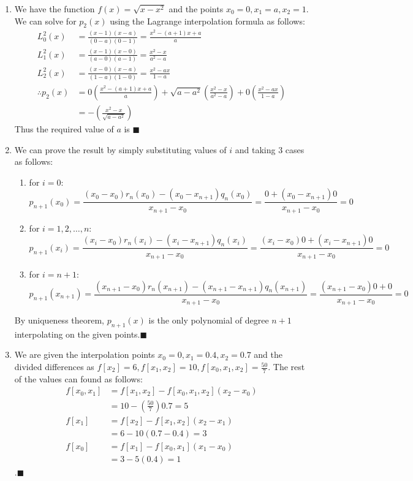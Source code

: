 \documentclass[a4paper, 11pt]{article}
\begin{document}
\begin{enumerate}[label=(\arabic*), leftmargin=*]
	\item We have the function $f(x)=\sqrt{x-x^2}$ and the points $x_0=0,x_1=a,x_2=1$. We can solve for $p_2(x)$ using the Lagrange interpolation formula as follows:
\begin{align*}
	L_0^2(x)&=\frac{(x-1)(x-a)}{(0-a)(0-1)}=\frac{x^2-(a+1)x+a}{a}\\
	L_1^2(x)&=\frac{(x-1)(x-0)}{(a-0)(a-1)}=\frac{x^2-x}{a^2-a}\\
	L_2^2(x)&=\frac{(x-0)(x-a)}{(1-a)(1-0)}=\frac{x^2-ax}{1-a}\\
	\therefore p_2(x)&=0\left(\frac{x^2-(a+1)x+a}{a}\right)+\sqrt{a-a^2}\left(\frac{x^2-x}{a^2-a}\right)+0\left(\frac{x^2-ax}{1-a}\right)\\
	&=-\left(\frac{x^2-x}{\sqrt{a-a^2}}\right)
\end{align*}
Thus the required value of $a$ is \hfill$\blacksquare$ 

	\item We can prove the result by simply substituting values of $i$ and taking 3 cases as follows:
	\begin{enumerate}[label=\roman*)]
		\item for $i=0$:
		$$p_{n+1}(x_0)=\frac{(x_0-x_0)r_n(x_0)-(x_0-x_{n+1})q_n(x_0)}{x_{n+1}-x_0}=\frac{0+(x_0-x_{n+1})0}{x_{n+1}-x_0}=0$$
		\item for $i=1,2,\dots,n$:
		$$p_{n+1}(x_i)=\frac{(x_i-x_0)r_n(x_i)-(x_i-x_{n+1})q_n(x_i)}{x_{n+1}-x_0}=\frac{(x_i-x_0)0+(x_i-x_{n+1})0}{x_{n+1}-x_0}=0$$
		\item for $i=n+1$: 
		$$p_{n+1}(x_{n+1})=\frac{(x_{n+1}-x_0)r_n(x_{n+1})-(x_{n+1}-x_{n+1})q_n(x_{n+1})}{x_{n+1}-x_0}=\frac{(x_{n+1}-x_0)0+0}{x_{n+1}-x_0}=0$$
	\end{enumerate}
By uniqueness theorem, $p_{n+1}(x)$ is the only polynomial of degree $n+1$ interpolating on the given points.\hfill$\blacksquare$

	\item We are given the interpolation points $x_0=0,x_1=0.4,x_2=0.7$ and the divided differences as $f[x_2]=6,f[x_1,x_2]=10,f[x_0,x_1,x_2]=\frac{50}{7}$. The rest of the values can found as follows:
\begin{align*}
	f[x_0,x_1]&=f[x_1,x_2]-f[x_0,x_1,x_2](x_2-x_0)\\
	&=10-\left(\frac{50}{7}\right)0.7=5\\
	f[x_1]&=f[x_2]-f[x_1,x_2](x_2-x_1)\\
	&=6-10(0.7-0.4)=3\\
	f[x_0]&=f[x_1]-f[x_0,x_1](x_1-x_0)\\
	&=3-5(0.4)=1
\end{align*}
.\hfill$\blacksquare$
\newpage


\end{enumerate}
\end{document}
